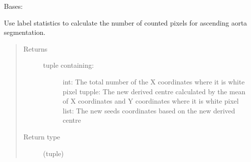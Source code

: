 \documentclass[letterpaper,10pt,english]{sphinxmanual}
\begin{document}
\begin{fulllineitems}
\label{\detokenize{AortaGeomReconDisplayModuleLib:AortaSegmenter.AortaSegmenter}}
\sphinxAtStartPar
Bases: 

\begin{fulllineitems}
\label{\detokenize{AortaGeomReconDisplayModuleLib:AortaSegmenter.AortaSegmenter.__count_pixel_asc}}
\sphinxAtStartPar
Use label statistics to calculate the number of counted pixels for ascending aorta segmentation.
\begin{quote}\begin{description}
\item[{Returns}] \leavevmode
\sphinxAtStartPar
\begin{description}
\item[{tuple containing:}] \leavevmode
\sphinxAtStartPar
int: The total number of the X coordinates where it is white pixel
tupple: The new derived centre calculated by the mean of X coordinates and Y coordinates where it is white pixel
list: The new seeds coordinates based on the new derived centre

\end{description}


\item[{Return type}] \leavevmode
\sphinxAtStartPar
(tuple)

\end{description}\end{quote}

\end{fulllineitems}



\end{fulllineitems}
\end{document}
